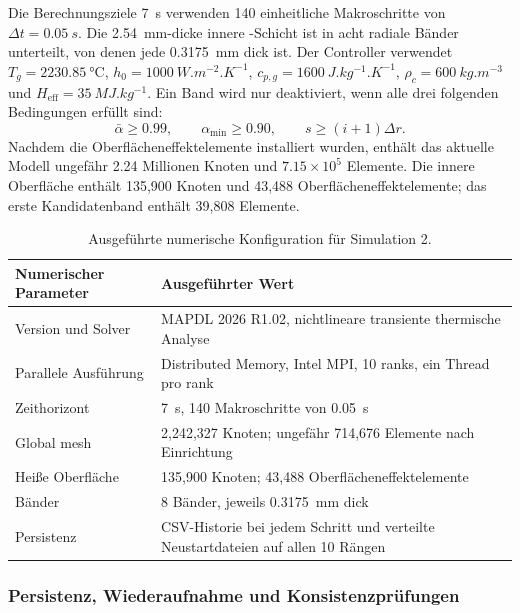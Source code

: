 \documentclass[oneside,openany]{amsdtx}
\begin{document}
Die Berechnungsziele \SI{7}{s} verwenden 140 einheitliche Makroschritte von \(\Delta t=\SI{0.05}{s}\). Die \SI{2.54}{mm}-dicke innere -Schicht ist in acht radiale Bänder unterteilt, von denen jede \SI{0.3175}{mm} dick ist. Der Controller verwendet \(T_g=\SI{2230.85}{\celsius}\), \(h_0=\SI{1000}{W.m^{-2}.K^{-1}}\), \(c_{p,g}=\SI{1600}{J.kg^{-1}.K^{-1}}\), \(\rho_c=\SI{600}{kg.m^{-3}}\) und \(H_\mathrm{eff}=\SI{35}{MJ.kg^{-1}}\). Ein Band wird nur deaktiviert, wenn alle drei folgenden Bedingungen erfüllt sind:
\[
  \bar\alpha\ge0.99,\qquad
  \alpha_\mathrm{min}\ge0.90,\qquad
  s\ge(i+1)\Delta r.
\]
Nachdem die Oberflächeneffektelemente installiert wurden, enthält das aktuelle Modell ungefähr 2.24 Millionen Knoten und \(7.15\times10^5\) Elemente. Die innere Oberfläche enthält 135,900 Knoten und 43,488 Oberflächeneffektelemente; das erste Kandidatenband enthält 39,808 Elemente.

\begin{table}[H]
\centering
\small
\renewcommand{\arraystretch}{1.15}
\begin{tabular}{L{0.38\textwidth}L{0.50\textwidth}}
\toprule
\textbf{Numerischer Parameter} & \textbf{Ausgeführter Wert} \\
\midrule
Version und Solver & MAPDL 2026 R1.02, nichtlineare transiente thermische Analyse \\
Parallele Ausführung & Distributed Memory, Intel MPI, 10 ranks, ein Thread pro rank \\
Zeithorizont & \SI{7}{s}, 140 Makroschritte von \SI{0.05}{s} \\
Global mesh & 2,242,327 Knoten; ungefähr 714,676 Elemente nach Einrichtung \\
Heiße Oberfläche & 135,900 Knoten; 43,488 Oberflächeneffektelemente \\
 Bänder & 8 Bänder, jeweils \SI{0.3175}{mm} dick \\
Persistenz & CSV-Historie bei jedem Schritt und verteilte Neustartdateien auf allen 10 Rängen \\
\bottomrule
\end{tabular}
\caption{Ausgeführte numerische Konfiguration für Simulation 2.}
\label{tab:sim2-implementation}
\end{table}

\subsubsection{Persistenz, Wiederaufnahme und Konsistenzprüfungen}
\end{document}
